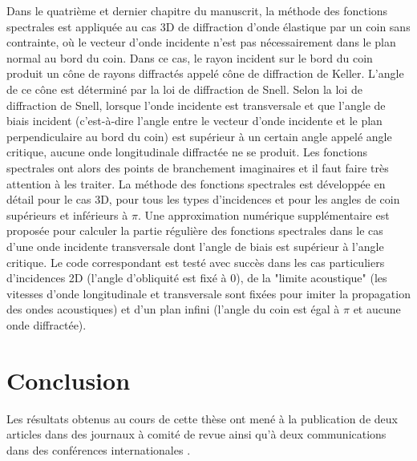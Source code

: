 Dans le quatrième et dernier chapitre du manuscrit, la méthode des fonctions spectrales est appliquée au cas 3D de diffraction d'onde élastique par un coin sans contrainte, où le vecteur d'onde incidente n'est pas nécessairement dans le plan normal au bord du coin. Dans ce cas, le rayon incident sur le bord du coin produit un cône de rayons diffractés appelé cône de diffraction de Keller. L'angle de ce cône est déterminé par la loi de diffraction de Snell. Selon la loi de diffraction de Snell, lorsque l'onde incidente est transversale et que l'angle de biais incident (c'est-à-dire l'angle entre le vecteur d'onde incidente et le plan perpendiculaire au bord du coin) est supérieur à un certain angle appelé angle critique, aucune onde longitudinale diffractée ne se produit. Les fonctions spectrales ont alors des points de branchement imaginaires et il faut faire très attention à les traiter. La méthode des fonctions spectrales est développée en détail pour le cas 3D, pour tous les types d'incidences et pour les angles de coin supérieurs et inférieurs à $\pi$. Une approximation numérique supplémentaire est proposée pour calculer la partie régulière des fonctions spectrales dans le cas d'une onde incidente transversale dont l'angle de biais est supérieur à l'angle critique. Le code correspondant est testé avec succès dans les cas particuliers d'incidences 2D (l'angle d'obliquité est fixé à $0$), de la "limite acoustique" (les vitesses d'onde longitudinale et transversale sont fixées pour imiter la propagation des ondes acoustiques) et d'un plan infini (l'angle du coin est égal à $\pi$ et aucune onde diffractée).

\section[Résumé de la thèse en français]{Conclusion}

Les résultats obtenus au cours de cette thèse ont mené à la publication de deux articles dans des journaux à comité de revue \cite{article, articleelasto} ainsi qu'à deux communications dans des conférences internationales \cite{DD2018,AFPAC}.